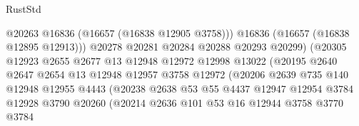 \begin{lexlean}{RustStd}
\begin{coremodule}
                                        @20263
                                        @16836
                                        (@16657 (@16838 @12905 @3758)))
                                      @16836
                                      (@16657 (@16838 @12895 @12913)))
                                    @20278
                                    @20281
                                    @20284
                                    @20288
                                    @20293
                                    @20299)
                                  (@20305
                                    @12923
                                    @2655
                                    @2677
                                    @13
                                    @12948
                                    @12972
                                    @12998
                                    @13022
                                    (@20195
                                      @2640
                                      @2647
                                      @2654
                                      @13
                                      @12948
                                      @12957
                                      @3758
                                      @12972
                                      (@20206
                                        @2639
                                        @735
                                        @140
                                        @12948
                                        @12955
                                        @4443
                                        (@20238
                                          @2638
                                          @53
                                          @55
                                          @4437
                                          @12947
                                          @12954
                                          @3784
                                          @12928
                                          @3790
                                          @20260
                                          (@20214
                                            @2636
                                            @101
                                            @53
                                            @16
                                            @12944
                                            @3758
                                            @3770
                                            @3784

\end{coremodule}
\end{lexlean}
